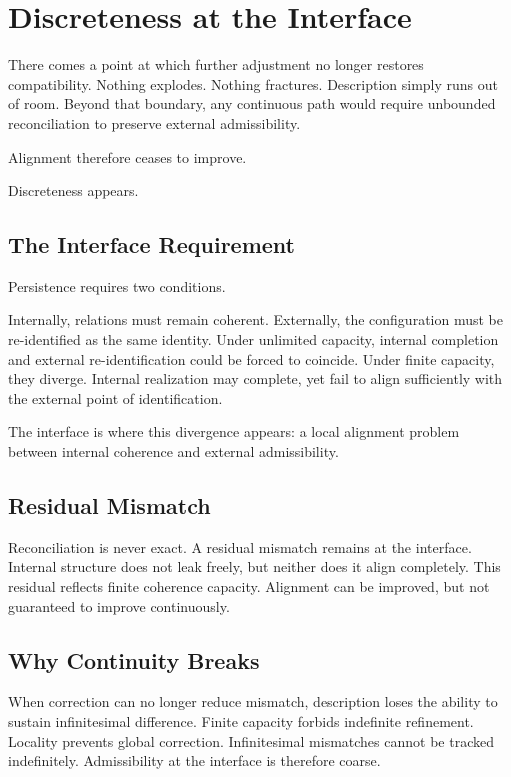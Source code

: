 \documentclass[11pt,twoside,openright]{book}
\begin{document}
\chapter{Discreteness at the Interface}

There comes a point at which further adjustment no longer restores compatibility. Nothing explodes. Nothing fractures. Description simply runs out of room. Beyond that boundary, any continuous path would require unbounded reconciliation to preserve external admissibility.

Alignment therefore ceases to improve.

Discreteness appears.

\section*{The Interface Requirement}

Persistence requires two conditions.

Internally, relations must remain coherent. Externally, the configuration must be re-identified as the same identity. Under unlimited capacity, internal completion and external re-identification could be forced to coincide. Under finite capacity, they diverge. Internal realization may complete, yet fail to align sufficiently with the external point of identification.

The interface is where this divergence appears: a local alignment problem between internal coherence and external admissibility.

\section*{Residual Mismatch}

Reconciliation is never exact. A residual mismatch remains at the interface. Internal structure does not leak freely, but neither does it align completely. This residual reflects finite coherence capacity. Alignment can be improved, but not guaranteed to improve continuously.

\section*{Why Continuity Breaks}

When correction can no longer reduce mismatch, description loses the ability to sustain infinitesimal difference. Finite capacity forbids indefinite refinement. Locality prevents global correction. Infinitesimal mismatches cannot be tracked indefinitely. Admissibility at the interface is therefore coarse.
\end{document}
